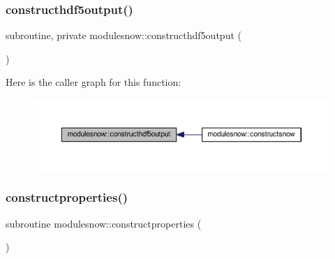 \subsubsection{\texorpdfstring{constructhdf5output()}{constructhdf5output()}}
{\footnotesize\ttfamily subroutine, private modulesnow\+::constructhdf5output (\begin{DoxyParamCaption}{ }\end{DoxyParamCaption})\hspace{0.3cm}{\ttfamily [private]}}

Here is the caller graph for this function\+:\nopagebreak
\begin{figure}[H]
\begin{center}
\leavevmode
\includegraphics[width=350pt]{namespacemodulesnow_a6d044212a6e9ba902389a391f8494f53_icgraph}
\end{center}
\end{figure}
\mbox{\label{namespacemodulesnow_a5906c8b8cc45f1a2cbb5a702d0d4aecc}} 
\subsubsection{\texorpdfstring{constructproperties()}{constructproperties()}}
{\footnotesize\ttfamily subroutine modulesnow\+::constructproperties (\begin{DoxyParamCaption}{ }\end{DoxyParamCaption})\hspace{0.3cm}{\ttfamily [private]}}

